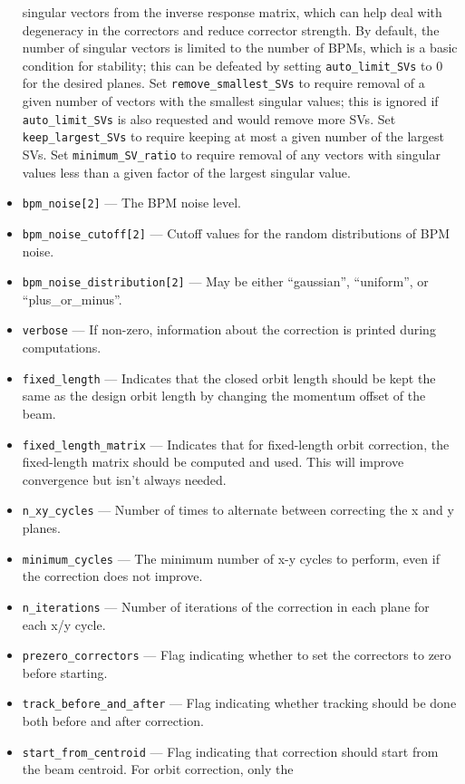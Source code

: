 \documentclass[11pt]{article}
\begin{document}
\begin{itemize}
  singular vectors from the inverse response matrix, which can help deal with degeneracy in the correctors and reduce corrector strength.
  By default, the number of singular vectors is limited to the number of BPMs, which is a basic condition for stability; this can be defeated by
  setting \verb|auto_limit_SVs| to 0 for the desired planes.  Set \verb|remove_smallest_SVs| to require removal of a given number of
  vectors with the smallest singular values; this is ignored if \verb|auto_limit_SVs| is also requested and would remove more SVs. 
  Set \verb|keep_largest_SVs| to require keeping at most a given number of the largest SVs.
  Set \verb|minimum_SV_ratio| to require removal of any vectors with singular values less than a given factor of the largest singular value.
\item \verb|bpm_noise[2]| --- The BPM noise level. 
\item \verb|bpm_noise_cutoff[2]| --- Cutoff values for the random distributions of BPM noise.
\item \verb|bpm_noise_distribution[2]| --- May be either ``gaussian'', ``uniform'', or ``plus\_or\_minus''.
\item \verb|verbose| --- If non-zero, information about the correction is printed during computations.
\item \verb|fixed_length| --- Indicates that the closed orbit length should be kept the same as the design orbit
length by changing the momentum offset of the beam.
\item \verb|fixed_length_matrix| --- Indicates that for fixed-length orbit correction, the fixed-length
matrix should be computed and used.  This will improve convergence but isn't always needed.
\item \verb|n_xy_cycles| --- Number of times to alternate between correcting the x and y planes.
\item \verb|minimum_cycles| --- The minimum number of x-y cycles to perform, even if the correction does not improve.
\item \verb|n_iterations| --- Number of iterations of the correction in each plane for each x/y cycle.
\item \verb|prezero_correctors| --- Flag indicating whether to set the correctors to zero before starting.
\item \verb|track_before_and_after| --- Flag indicating whether tracking should be done both before and after
correction.
\item \verb|start_from_centroid| --- Flag indicating that correction
should start from the beam centroid.  For orbit correction, only the

\end{itemize}
\end{document}
